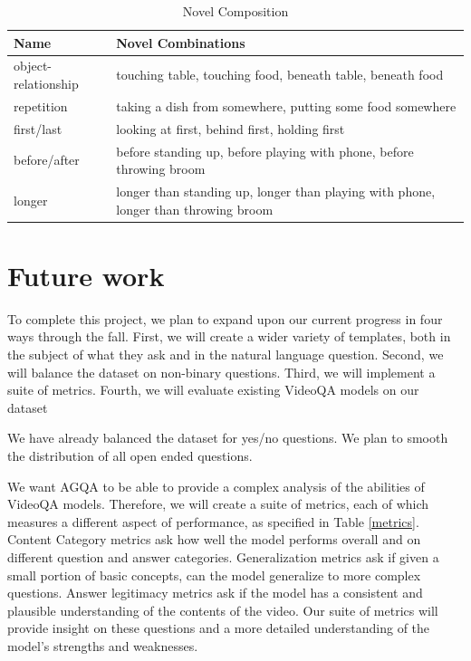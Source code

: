 \documentclass[10pt,twocolumn,letterpaper]{article}
\begin{document}
\begin{table}[]
    \begin{center}
    \caption{Novel Composition}
    \label{novel_composition_table}
    \begin{tabular}{|p{2cm}|p{5cm}|}
    \hline
    \textbf{Name} & \textbf{Novel Combinations} \\
    \hline
    object-relationship & touching table, touching food, beneath table, beneath food\\
    \hline
    repetition & taking a dish from somewhere, putting some food somewhere\\
    \hline
    first/last & looking at first, behind first, holding first \\
    \hline
    before/after & before standing up, before playing with phone, before throwing broom\\
    \hline
    longer & longer than standing up, longer than playing with phone, longer than throwing broom\\
    \hline
    
    \end{tabular}
    
    \end{center}
\end{table}

\section{Future work}

To complete this project, we plan to expand upon our current progress in four ways through the fall. First, we will create a wider variety of templates, both in the subject of what they ask and in the natural language question. Second, we will balance the dataset on non-binary questions. Third, we will implement a suite of metrics. Fourth, we will evaluate existing VideoQA models on our dataset~\cite{le2020hierarchical,fan2019heterogeneous,li2019beyond}

We have already balanced the dataset for yes/no questions. We plan to smooth the distribution of all open ended questions.

We want AGQA to be able to provide a complex analysis of the abilities of VideoQA models. Therefore, we will create a suite of metrics, each of which measures a different aspect of performance, as specified in Table \ref{metrics}. Content Category metrics ask how well the model performs overall and on different question and answer categories. Generalization metrics ask if given a small portion of basic concepts, can the model generalize to more complex questions. Answer legitimacy metrics ask if the model has a consistent and plausible understanding of the contents of the video. Our suite of metrics will provide insight on these questions and a more detailed understanding of the model's strengths and weaknesses.
\end{document}
